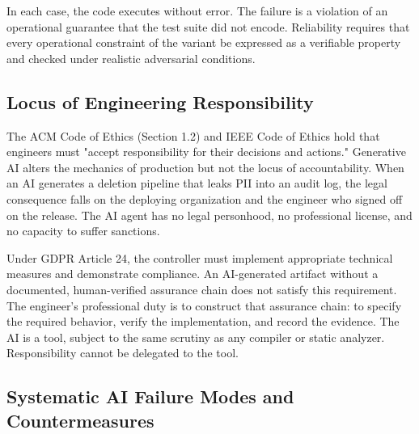 \documentclass[10pt,a4paper]{article}
\begin{document}
In each case, the code executes without error. The failure is a violation of an operational guarantee that the test suite did not encode. Reliability requires that every operational constraint of the variant be expressed as a verifiable property and checked under realistic adversarial conditions.

\subsection{Locus of Engineering Responsibility}

The ACM Code of Ethics (Section 1.2) and IEEE Code of Ethics hold that engineers must "accept responsibility for their decisions and actions." Generative AI alters the mechanics of production but not the locus of accountability. When an AI generates a deletion pipeline that leaks PII into an audit log, the legal consequence falls on the deploying organization and the engineer who signed off on the release. The AI agent has no legal personhood, no professional license, and no capacity to suffer sanctions.

Under GDPR Article 24, the controller must implement appropriate technical measures and demonstrate compliance. An AI-generated artifact without a documented, human-verified assurance chain does not satisfy this requirement. The engineer's professional duty is to construct that assurance chain: to specify the required behavior, verify the implementation, and record the evidence. The AI is a tool, subject to the same scrutiny as any compiler or static analyzer. Responsibility cannot be delegated to the tool.

\subsection{Systematic AI Failure Modes and Countermeasures}
\end{document}
